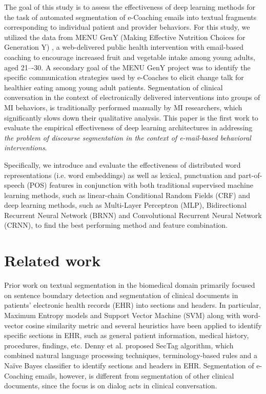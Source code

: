 \documentclass{amia}
\begin{document}
The goal of this study is to assess the effectiveness of deep learning methods for the task of automated segmentation of e-Coaching emails into textual fragments corresponding to individual patient and provider behaviors.  For this study, we utilized the data from MENU GenY (Making Effective Nutrition Choices for Generation Y) \cite{alexander2017motivations}, a web-delivered public health intervention with email-based coaching to encourage increased fruit and vegetable intake among young adults, aged 21–-30. A secondary goal of the MENU GenY project was to identify the specific communication strategies used by e-Coaches to elicit change talk for healthier eating among young adult patients. Segmentation of clinical conversation in the context of electronically delivered interventions into groups of MI behaviors, is traditionally performed manually by MI researchers, which significantly slows down their qualitative analysis. This paper is the first work to evaluate the empirical effectiveness of deep learning architectures in addressing \textit{the problem of discourse segmentation in the context of e-mail-based behavioral interventions}. 

Specifically, we introduce and evaluate the effectiveness of distributed word representations (i.e. word embeddings) as well as lexical, punctuation and part-of-speech (POS) features in conjunction with both traditional supervised machine learning methods, such as linear-chain Conditional Random Fields (CRF)\cite{lafferty2001conditional} and deep learning methods, such as Multi-Layer Perceptron (MLP),\cite{rumelhart1986learning} Bidirectional Recurrent Neural Network (BRNN)\cite{schuster1997bidirectional} and Convolutional Recurrent Neural Network (CRNN),\cite{treviso2017sentence} to find the best performing method and feature combination. 

\section*{Related work}

Prior work on textual segmentation in the biomedical domain primarily focused on sentence boundary detection \cite{griffis2016quantitative,kreuzthaler2015detection,treviso2017sentence} and segmentation of clinical documents in patients' electronic health records (EHR) into sections and headers. \cite{apostolova2009automatic,denny2009evaluation,tepper2012statistical,cho2002text} In particular, Maximum Entropy models \cite{tepper2012statistical} and Support Vector Machine (SVM) along with word-vector cosine similarity metric and several heuristics \cite{apostolova2009automatic} have been applied to identify specific sections in EHR, such as general patient information, medical history, procedures, findings, etc. Denny et al. \cite{denny2009evaluation} proposed SecTag algorithm, which combined natural language processing techniques, terminology-based rules and a Na\"{i}ve Bayes classifier to identify sections and headers in EHR. Segmentation of e-Coaching emails, however, is different from segmentation of other clinical documents, since the focus is on dialog acts in clinical conversation.   
\end{document}

